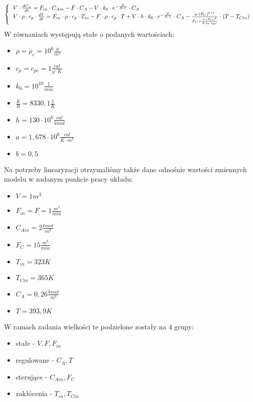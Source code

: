 \begin{equation}
	\left\{
	\begin{tabular}{l}
	$V \cdot \frac{dC_A}{dt}=F_{in} \cdot C_{Ain}-F \cdot C_A-V \cdot k_0 \cdot e^{-\frac{E}{R \cdot T}} \cdot C_A$\\
	$V \cdot \rho \cdot c_p \cdot \frac{dT}{dt}=F_{in} \cdot \rho \cdot c_p \cdot T_{in}-F \cdot \rho \cdot c_p \cdot T+V \cdot h \cdot k_0 \cdot e^{-\frac{E}{R \cdot T}} \cdot C_A - \frac{a \cdot (F_C)^{b+1}}{F_C+\frac{a \cdot (F_C)^b}{2 \cdot \rho_c \cdot c_{pc}}} \cdot (T-T_{Cin})$
	\end{tabular}
	\right.
\end{equation}
W równaniach występują stałe o podanych wartościach:\\
\begin{itemize}
	\item $\rho=\rho_c=10^6\frac{g}{m^3}$
	\item $c_p=c_{pc} = 1 \frac{cal}{g\cdot K}$
	\item $k_0 = 10^{10} \frac{1}{min}$
	\item $\frac{E}{R} = 8330,1 \frac{1}{K}$
	\item $h = 130\cdot 10^6 \frac{cal}{kmol}$
	\item $a = 1,678\cdot 10^6\frac{cal}{K\cdot m^3}$
	\item $b = 0,5$
\end{itemize}
Na potrzeby linearyzacji otrzymaliśmy także dane odnośnie wartości zmiennych modelu w zadanym punkcie pracy układu:\\
\begin{itemize}
	\item $V=1m^3$
	\item $F_{in} = F = 1 \frac{m^3}{min}$
	\item $C_{Ain} = 2 \frac{kmol}{m^3}$
	\item $F_C = 15 \frac{m^3}{min}$
	\item $T_{in} = 323K$
	\item $T_{Cin} = 365K$
	\item $C_A = 0,26\frac{kmol}{m^3}$
	\item $T = 393,9K$
\end{itemize}
W ramach zadania wielkości te podzielone zostały na 4 grupy:\\
\begin{itemize}
	\item stałe - $V,F,F_{in}$
	\item regulowane - $C_A,T$
	\item sterujące - $C_{Ain},F_C$
	\item zakłócenia - $T_{in},T_{Cin}$
\end{itemize}
